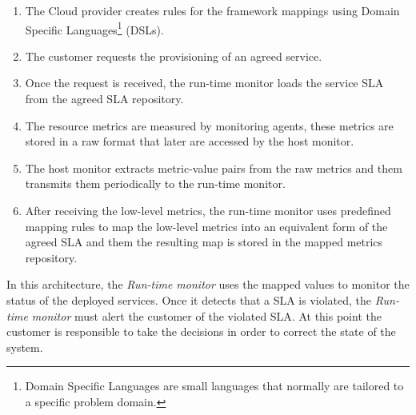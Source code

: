 \begin{enumerate}
  \item The Cloud provider creates rules for the framework mappings using Domain Specific
  Languages\footnote{Domain Specific Languages are small languages that normally are tailored to a specific
  problem domain.} (DSLs).
  \item The customer requests the provisioning of an agreed service.
  \item Once the request is received, the run-time monitor loads the service SLA from the agreed SLA repository.
  \item The resource metrics are measured by monitoring agents, these metrics are stored in a raw format that
  later are accessed by the host monitor.
  \item The host monitor extracts metric-value pairs from the raw metrics and them transmits them periodically to
  the run-time monitor.
  \item After receiving the low-level metrics, the run-time monitor uses predefined mapping rules to map the
  low-level metrics into an equivalent form of the agreed SLA and them the resulting map is stored in the
  mapped metrics repository.
\end{enumerate}

In this architecture, the \textit{Run-time monitor} uses the mapped values to monitor the status of the deployed services. Once it detects that a SLA is violated, the \textit{Run-time monitor} must alert the customer of the violated SLA.
At this point the customer is responsible to take the decisions in order to correct the state of the system.
